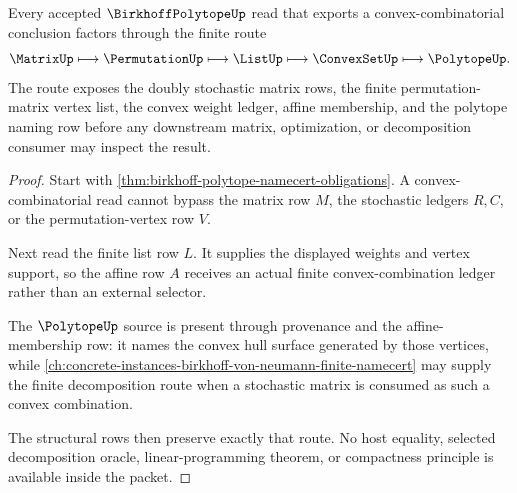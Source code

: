 \begin{theorem}
\label{thm:birkhoff-polytope-finite-vertex-route}
Every accepted $\BirkhoffPolytopeUp$ read that exports a convex-combinatorial conclusion factors through the finite route
$$
\MatrixUp \longmapsto \PermutationUp \longmapsto \ListUp \longmapsto \ConvexSetUp \longmapsto \PolytopeUp .
$$
The route exposes the doubly stochastic matrix rows, the finite permutation-matrix vertex list, the convex weight ledger, affine membership, and the polytope naming row before any downstream matrix, optimization, or decomposition consumer may inspect the result.
\end{theorem}
\begin{proof}
Start with \autoref{thm:birkhoff-polytope-namecert-obligations}. A convex-combinatorial read cannot bypass the matrix row $M$, the stochastic ledgers $R,C$, or the permutation-vertex row $V$.

Next read the finite list row $L$. It supplies the displayed weights and vertex support, so the affine row $A$ receives an actual finite convex-combination ledger rather than an external selector.

The $\PolytopeUp$ source is present through provenance and the affine-membership row: it names the convex hull surface generated by those vertices, while \autoref{ch:concrete-instances-birkhoff-von-neumann-finite-namecert} may supply the finite decomposition route when a stochastic matrix is consumed as such a convex combination.

The structural rows then preserve exactly that route. No host equality, selected decomposition oracle, linear-programming theorem, or compactness principle is available inside the packet.
\end{proof}

\begin{closurestatus}{\BirkhoffPolytopeUp}
  \theoryclosure{\seedClosure}
  \formalstatus{\unformalizedV}
\end{closurestatus}
